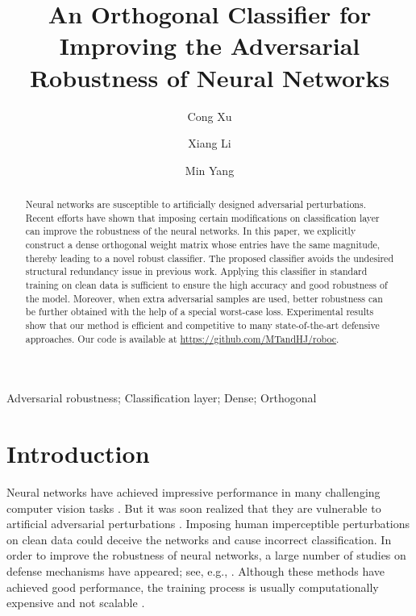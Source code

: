 \documentclass[preprint,review,12pt]{elsarticle}
\numberwithin{equation}{section}
\begin{document}
\begin{frontmatter}
\title{An Orthogonal Classifier for Improving the Adversarial Robustness of Neural Networks }
\author[label1] {Cong Xu }
\author[label2] {Xiang Li }
\author[label1] {Min Yang }

\address[label1]{School of Mathematics and Information Sciences, Yantai University, Yantai 264005, China}
\address[label2]{Software Engineering Institute, East China Normal University, Shanghai, China}	
	
	
	
	\begin{abstract}
		Neural networks are susceptible to artificially designed adversarial perturbations.
		Recent efforts have shown that imposing certain modifications on classification layer can improve the robustness of the neural networks.
        In this paper, we explicitly construct a dense orthogonal weight matrix whose entries have the same magnitude, thereby leading to a novel robust classifier.
	    The proposed classifier avoids the undesired structural redundancy issue in previous work.
        Applying this classifier in standard training on clean data is sufficient to ensure the high accuracy and good robustness of the model.
        Moreover,  when extra adversarial samples are used, better robustness can be further obtained with the help of a special worst-case loss.
        Experimental results  show that our method is efficient and competitive to many state-of-the-art defensive approaches.
        Our code is available at \url{https://github.com/MTandHJ/roboc}.
    \end{abstract}


	\begin{keyword}
	Adversarial robustness; Classification layer; Dense; Orthogonal
	\end{keyword}
	
\end{frontmatter}

	\section{Introduction}
	
	Neural networks have achieved impressive performance in many challenging computer vision tasks \cite{he2016,krizhevsky2009,lecun1998,wang2019}.
	But it was soon realized that they are vulnerable to artificial adversarial perturbations \cite{goodfellow2015,szegedy2013,wang2021,xu2020}.
	Imposing human imperceptible perturbations on clean data could deceive the networks and cause incorrect classification.
	In order to improve the robustness of neural networks,
    a large number of studies on defense mechanisms have appeared; see, e.g., \cite{cohen2019,gowal2019,guo2019,han2019,madry2018,wang2020,zhang2019b}.
    Although these methods have achieved good performance,
    the training process is usually computationally expensive and not scalable \cite{shafahi2019,zhang2019a}.
\end{document}
